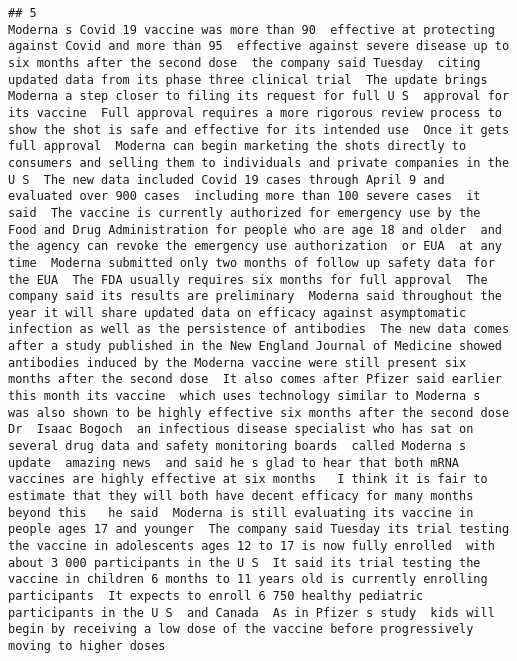 \documentclass[
]{article}
\begin{document}
\begin{verbatim}
## 5                                                             Moderna s Covid 19 vaccine was more than 90  effective at protecting against Covid and more than 95  effective against severe disease up to six months after the second dose  the company said Tuesday  citing updated data from its phase three clinical trial  The update brings Moderna a step closer to filing its request for full U S  approval for its vaccine  Full approval requires a more rigorous review process to show the shot is safe and effective for its intended use  Once it gets full approval  Moderna can begin marketing the shots directly to consumers and selling them to individuals and private companies in the U S  The new data included Covid 19 cases through April 9 and evaluated over 900 cases  including more than 100 severe cases  it said  The vaccine is currently authorized for emergency use by the Food and Drug Administration for people who are age 18 and older  and the agency can revoke the emergency use authorization  or EUA  at any time  Moderna submitted only two months of follow up safety data for the EUA  The FDA usually requires six months for full approval  The company said its results are preliminary  Moderna said throughout the year it will share updated data on efficacy against asymptomatic infection as well as the persistence of antibodies  The new data comes after a study published in the New England Journal of Medicine showed antibodies induced by the Moderna vaccine were still present six months after the second dose  It also comes after Pfizer said earlier this month its vaccine  which uses technology similar to Moderna s  was also shown to be highly effective six months after the second dose  Dr  Isaac Bogoch  an infectious disease specialist who has sat on several drug data and safety monitoring boards  called Moderna s update  amazing news  and said he s glad to hear that both mRNA vaccines are highly effective at six months   I think it is fair to estimate that they will both have decent efficacy for many months beyond this   he said  Moderna is still evaluating its vaccine in people ages 17 and younger  The company said Tuesday its trial testing the vaccine in adolescents ages 12 to 17 is now fully enrolled  with about 3 000 participants in the U S  It said its trial testing the vaccine in children 6 months to 11 years old is currently enrolling participants  It expects to enroll 6 750 healthy pediatric participants in the U S  and Canada  As in Pfizer s study  kids will begin by receiving a low dose of the vaccine before progressively moving to higher doses 

\end{verbatim}
\end{document}
